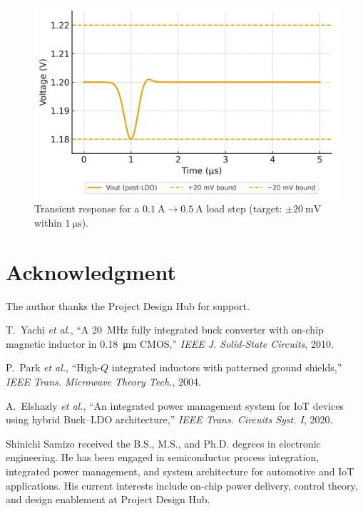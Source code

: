 \documentclass[journal]{IEEEtran}
\begin{document}
\begin{figure}[t]
  \centering
  \includegraphics[width=\columnwidth]{fig/fig5_transient_response.png}
  \caption{Transient response for a \(\SI{0.1}{\ampere}\rightarrow\SI{0.5}{\ampere}\) load step (target: \(\pm\SI{20}{\milli\volt}\) within \(\SI{1}{\micro\second}\)).}
  \label{fig:transient}
\end{figure}

\section*{Acknowledgment}
The author thanks the Project Design Hub for support.

\begin{thebibliography}{9}
T.~Yachi \emph{et al.}, ``A \SI{20}{\mega\hertz} fully integrated buck converter with on-chip magnetic inductor in \SI{0.18}{\micro\meter} CMOS,'' \emph{IEEE J. Solid-State Circuits}, 2010.

P.~Park \emph{et al.}, ``High-\(Q\) integrated inductors with patterned ground shields,'' \emph{IEEE Trans. Microwave Theory Tech.}, 2004.

A.~Elshazly \emph{et al.}, ``An integrated power management system for IoT devices using hybrid Buck--LDO architecture,'' \emph{IEEE Trans. Circuits Syst. I}, 2020.
\end{thebibliography}

\begin{IEEEbiographynophoto}{Shinichi Samizo}
received the B.S., M.S., and Ph.D. degrees in electronic engineering. He has been engaged in semiconductor process integration, integrated power management, and system architecture for automotive and IoT applications. His current interests include on-chip power delivery, control theory, and design enablement at Project Design Hub.
\end{IEEEbiographynophoto}
\end{document}
